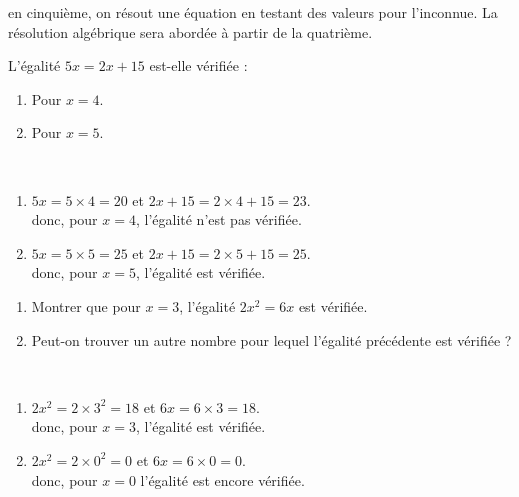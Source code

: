 \bigskip

\begin{remarque}
   en cinquième, on résout une équation en testant des valeurs pour l'inconnue. La résolution algébrique sera abordée à partir de la quatrième.
\end{remarque}

\exercicesbase

\begin{colonne*exercice}


\bigskip

\begin{exercice} %
   L'égalité $5x =2x+15$ est-elle vérifiée :
   \begin{enumerate}
      \item Pour $x =4$.
      \item Pour $x =5$.
   \end{enumerate}
\end{exercice}

\begin{corrige}
   \ \\ [-5mm]
   \begin{enumerate}
      \item $5x =5\times4 =20$ et $2x+15 =2\times4+15 =23$. \\
       donc, pour $x =4$, {\blue l'égalité n'est pas vérifiée}.
      \item $5x =5\times5 =25$ et $2x+15=2\times5+15 =25$. \\
       donc, pour $x =5$, {\blue l'égalité est vérifiée.}
   \end{enumerate}
\end{corrige}

\bigskip


\begin{exercice} %
   \begin{enumerate}
      \item Montrer que pour $x =3$, l'égalité $2x^2 =6x$ est vérifiée.
      \item Peut-on trouver un autre nombre pour lequel l'égalité précédente est vérifiée ?
   \end{enumerate}
\end{exercice}

\begin{corrige}
   \ \\ [-5mm]
   \begin{enumerate}
      \item $2x^2 =2\times3^2 =18$ et $6x =6\times3 =18$. \\
      donc, pour $x =3$, {\blue l'égalité est vérifiée}.
      \item $2x^2 =2\times0^2 =0$ et $6x =6\times0 =0$. \\
      donc, {\blue pour $x =0$} l'égalité est encore vérifiée.
   \end{enumerate}
\end{corrige}


\end{colonne*exercice}
